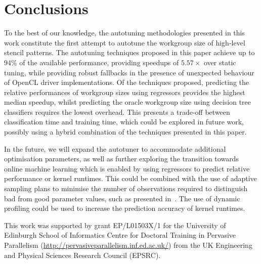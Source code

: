 \documentclass[preprint,nonatbib,10pt]{sigplanconf}
\begin{document}


\section{Conclusions}\label{sec:conclusions}

To the best of our knowledge, the autotuning methodologies presented
in this work constitute the first attempt to autotune the workgroup
size of high-level stencil patterns. The autotuning techniques
proposed in this paper achieve up to 94\% of the available
performance, providing speedups of $5.57\times$ over static tuning,
while providing robust fallbacks in the presence of unexpected
behaviour of OpenCL driver implementations. Of the techniques
proposed, predicting the relative performances of workgroup sizes
using regressors provides the highest median speedup, whilst
predicting the oracle workgroup size using decision tree classifiers
requires the lowest overhead. This presents a trade-off between
classification time and training time, which could be explored in
future work, possibly using a hybrid combination of the techniques
presented in this paper.

In the future, we will expand the autotuner to accommodate additional
optimisation parameters, as well as further exploring the transition
towards online machine learning which is enabled by using regressors
to predict relative performance or kernel runtimes. This could be
combined with the use of adaptive sampling plans to minimise the
number of observations required to distinguish bad from good parameter
values, such as presented in~\cite{Leather2009}. The use of dynamic
profiling could be used to increase the prediction accuracy of kernel
runtimes.


\acks

This work was supported by grant EP/L01503X/1 for the University of
Edinburgh School of Informatics Centre for Doctoral Training in
Pervasive Parallelism
(\url{http://pervasiveparallelism.inf.ed.ac.uk/}) from the UK
Engineering and Physical Sciences Research Council (EPSRC).


\label{bibliography}
\printbibliography
\end{document}
